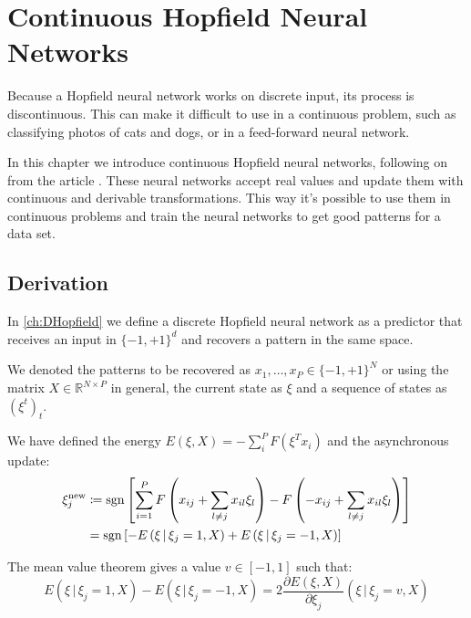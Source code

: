 \chapter{Continuous Hopfield Neural Networks}
\label{ch:CHopfield}

Because a Hopfield neural network works on discrete input, its process is discontinuous. This can make it difficult to use in a continuous problem, such as classifying photos of cats and dogs, or in a feed-forward neural network.

\noindent In this chapter we introduce continuous Hopfield neural networks, following on from the article \cite{ramsauer2021hopfieldnetworksneed}. These neural networks accept real values and update them with continuous and derivable transformations. This way it's possible to use them in continuous problems and train the neural networks to get good patterns for a data set.

\section{Derivation}
In \cref{ch:DHopfield} we define a discrete Hopfield neural network as a predictor that receives an input in $\{-1,+1\}^d$ and recovers a pattern in the same space.

\noindent We denoted the patterns to be recovered as $x_1,\ldots,x_P \in \{-1,+1\}^N$ or using the matrix $X\in\mathbb{R}^{N\times P}$ in general, the current state as $\xi$ and a sequence of states as $(\xi^t)_t$.

\noindent We have defined the energy $E\left(\xi,X\right) = -\sum_{i}^{P} F\left(\xi^Tx_i\right)$ and the asynchronous update:
\begin{align*}
	\xi^{\text{new}}_j &\coloneqq \operatorname{sgn} \left[\sum_{i=1}^{P}F\left(x_{ij}+\sum_{l\neq j}x_{il}\xi_l\right)-F\left(-x_{ij}+\sum_{l\neq j}x_{il}\xi_l\right)\right] \\
	&= \operatorname{sgn} \left[-E\left(\xi\,|\,\xi_j=1,X\right)+E\left(\xi\,|\,\xi_j=-1,X\right)\right]
\end{align*}

\noindent The mean value theorem gives a value $v\in\left[-1,1\right]$ such that:
\begin{equation}
    E\left(\xi\,|\,\xi_j=1,X\right)-E\left(\xi\,|\,\xi_j=-1,X\right) = 2\frac{\partial E\left(\xi,X\right)}{\partial \xi_j}\left(\xi\,|\,\xi_j=v,X\right)
\end{equation}

